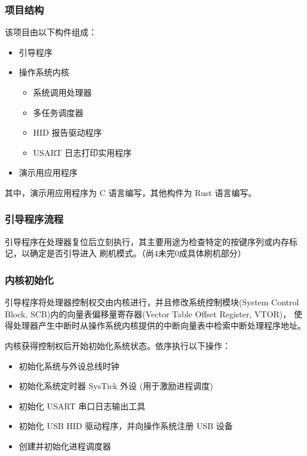 \documentclass[aspectratio=169]{beamer}
\begin{document}
\begin{frame}
    \frametitle{项目结构}
    
    该项目由以下构件组成：

    \begin{itemize}
        \item 引导程序
        \item 操作系统内核
        \begin{itemize}
            \item 系统调用处理器
            \item 多任务调度器
            \item HID 报告驱动程序
            \item USART 日志打印实用程序
        \end{itemize}
        \item 演示用应用程序
    \end{itemize}

    其中，演示用应用程序为 C 语言编写，其他构件为 Rust 语言编写。
\end{frame}

\begin{frame}
    \frametitle{引导程序流程}

    引导程序在处理器复位后立刻执行，其主要用途为检查特定的按键序列或内存标记，以确定是否引导进入
    刷机模式。（尚4未完0成具体刷机部分）
    
    \vspace{1em}

\end{frame}

\begin{frame}
    \frametitle{内核初始化}

    引导程序将处理器控制权交由内核进行，并且修改系统控制模块(System Control Block, SCB)内的向量表偏移量寄存器(Vector Table Offset Register, VTOR)，
    使得处理器产生中断时从操作系统内核提供的中断向量表中检索中断处理程序地址。
    \par
    内核获得控制权后开始初始化系统状态。依序执行以下操作：
    \begin{itemize}
        \item 初始化系统与外设总线时钟
        \item 初始化系统定时器 SysTick 外设 (用于激励进程调度)
        \item 初始化 USART 串口日志输出工具
        \item 初始化 USB HID 驱动程序，并向操作系统注册 USB 设备
        \item 创建并初始化进程调度器
    \end{itemize}
\end{frame}
\end{document}

